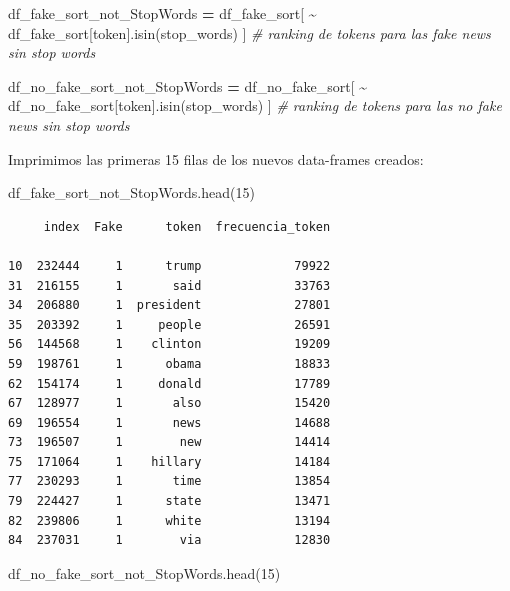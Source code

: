 \documentclass[
  11pt,
  a4paper,
]{article}
\newenvironment{Shaded}{\begin{snugshade}}{\end{snugshade}}
\newcommand{\CommentTok}[1]{\textcolor[rgb]{0.56,0.35,0.01}{\textit{#1}}}
\newcommand{\DecValTok}[1]{\textcolor[rgb]{0.00,0.00,0.81}{#1}}
\newcommand{\NormalTok}[1]{#1}
\newcommand{\OperatorTok}[1]{\textcolor[rgb]{0.81,0.36,0.00}{\textbf{#1}}}
\newcommand{\StringTok}[1]{\textcolor[rgb]{0.31,0.60,0.02}{#1}}
\begin{document}
\begin{Shaded}
\begin{Highlighting}[]
\NormalTok{df\_fake\_sort\_not\_StopWords }\OperatorTok{=}\NormalTok{ df\_fake\_sort[ }\OperatorTok{\textasciitilde{}}\NormalTok{ df\_fake\_sort[}\StringTok{\textquotesingle{}token\textquotesingle{}}\NormalTok{].isin(stop\_words) ] }\CommentTok{\# ranking de tokens para las fake news sin stop words}
\end{Highlighting}
\end{Shaded}

\begin{Shaded}
\begin{Highlighting}[]
\NormalTok{df\_no\_fake\_sort\_not\_StopWords }\OperatorTok{=}\NormalTok{ df\_no\_fake\_sort[ }\OperatorTok{\textasciitilde{}}\NormalTok{ df\_no\_fake\_sort[}\StringTok{\textquotesingle{}token\textquotesingle{}}\NormalTok{].isin(stop\_words) ] }\CommentTok{\# ranking de tokens para las no fake news sin stop words}
\end{Highlighting}
\end{Shaded}

Imprimimos las primeras 15 filas de los nuevos data-frames creados:

\begin{Shaded}
\begin{Highlighting}[]
\NormalTok{df\_fake\_sort\_not\_StopWords.head(}\DecValTok{15}\NormalTok{)}
\end{Highlighting}
\end{Shaded}

\begin{verbatim}
     index  Fake      token  frecuencia_token
     
10  232444     1      trump             79922
31  216155     1       said             33763
34  206880     1  president             27801
35  203392     1     people             26591
56  144568     1    clinton             19209
59  198761     1      obama             18833
62  154174     1     donald             17789
67  128977     1       also             15420
69  196554     1       news             14688
73  196507     1        new             14414
75  171064     1    hillary             14184
77  230293     1       time             13854
79  224427     1      state             13471
82  239806     1      white             13194
84  237031     1        via             12830
\end{verbatim}

\begin{Shaded}
\begin{Highlighting}[]
\NormalTok{df\_no\_fake\_sort\_not\_StopWords.head(}\DecValTok{15}\NormalTok{)}
\end{Highlighting}
\end{Shaded}
\end{document}

